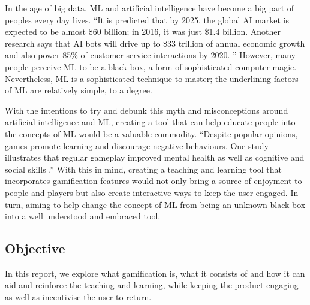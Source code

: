 		In the age of big data, \ac{ML} and artificial intelligence have become a big part of peoples every day lives. “It is predicted that by 2025, the global AI market is expected to be almost \$60 billion; in 2016, it was just \$1.4 billion. Another research says that AI bots will drive up to \$33 trillion of annual economic growth and also power 85\% of customer service interactions by 2020. \cite{hackernoon}” However, many people perceive \ac{ML} to be a black box, a form of sophisticated computer magic. Nevertheless, \ac{ML} is a sophisticated technique to master; the underlining factors of \ac{ML} are relatively simple, to a degree.
		
		With the intentions to try and debunk this myth and misconceptions around artificial intelligence and \ac{ML}, creating a tool that can help educate people into the concepts of \ac{ML} would be a valuable commodity. “Despite popular opinions, games promote learning and discourage negative behaviours. One study illustrates that regular gameplay improved mental health as well as cognitive and social skills \cite{classcraft}.” With this in mind, creating a teaching and learning tool that incorporates gamification features would not only bring a source of enjoyment to people and players but also create interactive ways to keep the user engaged. In turn, aiming to help change the concept of \ac{ML} from being an unknown black box into a well understood and embraced tool.
	
	\subsection{Objective}
		\label{sec:intro_objective} 
		
		In this report, we explore what gamification is, what it consists of and how it can aid and reinforce the teaching and learning, while keeping the product engaging as well as incentivise the user to return.
		
%		
	
